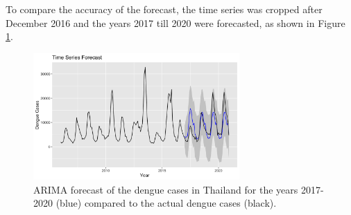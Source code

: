 	To compare the accuracy of the forecast, the time series was cropped after December 2016 and the years 2017 till 2020 were forecasted, as shown in Figure \ref{fig:Auto_ARIMA_2016}. 
		\begin{figure}[hbpt] 
		\centering
		\includegraphics[width=0.7\textwidth]{fig/Auto_ARIMA_2016.png}
		\caption{ARIMA forecast of the dengue cases in Thailand for the years 2017-2020 (blue) compared to the actual dengue cases (black).}
		\label{fig:Auto_ARIMA_2016}
	\end{figure}

	